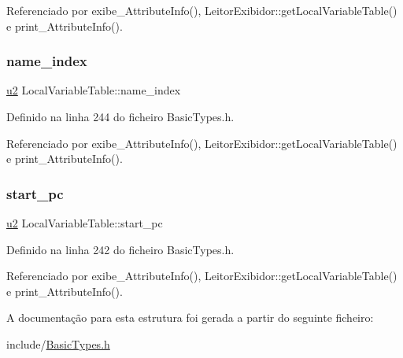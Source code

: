 Referenciado por exibe\+\_\+\+Attribute\+Info(), Leitor\+Exibidor\+::get\+Local\+Variable\+Table() e print\+\_\+\+Attribute\+Info().

\mbox{\label{structLocalVariableTable_ac533f255b730a2442710dd5568cdb151}} 
\subsubsection{\texorpdfstring{name\+\_\+index}{name\_index}}
{\footnotesize\ttfamily \hyperlink{BasicTypes_8h_a732cde1300aafb73b0ea6c2558a7a54f}{u2} Local\+Variable\+Table\+::name\+\_\+index}



Definido na linha 244 do ficheiro Basic\+Types.\+h.



Referenciado por exibe\+\_\+\+Attribute\+Info(), Leitor\+Exibidor\+::get\+Local\+Variable\+Table() e print\+\_\+\+Attribute\+Info().

\mbox{\label{structLocalVariableTable_a59c9262cde04e95d5600bab33ffa969e}} 
\subsubsection{\texorpdfstring{start\+\_\+pc}{start\_pc}}
{\footnotesize\ttfamily \hyperlink{BasicTypes_8h_a732cde1300aafb73b0ea6c2558a7a54f}{u2} Local\+Variable\+Table\+::start\+\_\+pc}



Definido na linha 242 do ficheiro Basic\+Types.\+h.



Referenciado por exibe\+\_\+\+Attribute\+Info(), Leitor\+Exibidor\+::get\+Local\+Variable\+Table() e print\+\_\+\+Attribute\+Info().



A documentação para esta estrutura foi gerada a partir do seguinte ficheiro\+:\begin{DoxyCompactItemize}
\item 
include/\hyperlink{BasicTypes_8h}{Basic\+Types.\+h}\end{DoxyCompactItemize}
